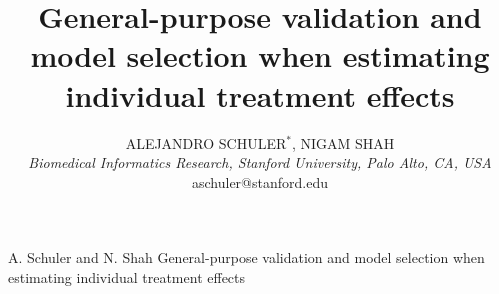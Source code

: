 \documentclass[oupdraft]{bio}
\begin{document}
\title{General-purpose validation and model selection when estimating individual treatment effects}

\author{ALEJANDRO SCHULER$^\ast$, NIGAM SHAH\\[4pt]
\textit{Biomedical Informatics Research, Stanford University, Palo Alto, CA, USA} \\[2pt]
{aschuler@stanford.edu}}

\markboth%
{A. Schuler and N. Shah}
{General-purpose validation and model selection when estimating individual treatment effects}

\maketitle




 








\end{document}
